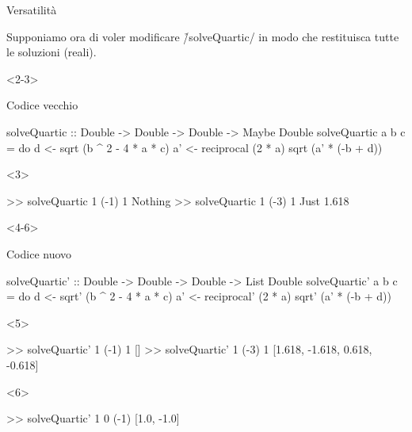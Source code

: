 \begin{frame}[fragile]{\secname}{Versatilità}
\begin{overlayarea}{\textwidth}{0.7\textheight}
Supponiamo ora di voler modificare \h/solveQuartic/ in modo che restituisca tutte le soluzioni (reali).

\begin{onlyenv}<2-3>
\begin{block}{Codice vecchio}
\begin{haskellcode}
solveQuartic
    :: Double -> Double -> Double -> Maybe Double
solveQuartic  a b c = do
    d  <- sqrt  (b ^ 2 - 4 * a * c)
    a' <- reciprocal  (2 * a)
    sqrt  (a' * (-b + d))
\end{haskellcode}

\begin{onlyenv}<3>
\begin{runhaskell}
>>  solveQuartic 1 (-1) 1
    Nothing
>>  solveQuartic 1 (-3) 1
    Just 1.618
\end{runhaskell}
\end{onlyenv}
\end{block}
\end{onlyenv}

\begin{onlyenv}<4-6>
\begin{block}{Codice nuovo}
\begin{haskellcode}
solveQuartic'
    :: Double -> Double -> Double -> List Double
solveQuartic' a b c = do
    d  <- sqrt' (b ^ 2 - 4 * a * c)
    a' <- reciprocal' (2 * a)
    sqrt' (a' * (-b + d))
\end{haskellcode}

\begin{onlyenv}<5>
\begin{runhaskell}
>>  solveQuartic' 1 (-1) 1
    []
>>  solveQuartic' 1 (-3) 1
    [1.618, -1.618, 0.618, -0.618]
\end{runhaskell}
\end{onlyenv}
\begin{onlyenv}<6>
\begin{runhaskell}
>>  solveQuartic' 1 0 (-1)
    [1.0, -1.0]
\end{runhaskell}
\end{onlyenv}
\end{block}
\end{onlyenv}
\end{overlayarea}
\end{frame}